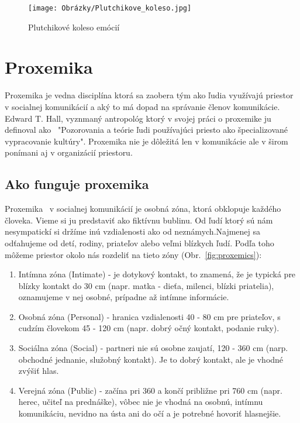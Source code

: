 \documentclass[10pt,twoside,slovak,a4paper]{article}
\begin{document}
\begin{figure}[H]
		\centering
		\texttt{[image: Obrázky/Plutchikove\_koleso.jpg]}
		\caption{Plutchikové koleso emócií~\cite{emocie}}
		\label{fig:EWheel}
\end{figure}

\pagebreak

\section{Proxemika}\label{proxemika}

Proxemika je vedna disciplína ktorá sa zaobera tým ako ľudia využívajú priestor v
socialnej komunikácií a aký to má dopad na správanie členov komunikácie. Edward T. Hall,
vyznmaný antropológ ktorý v svojej práci o proxemike ju definoval ako~\cite{proxemics} "Pozorovania a teórie
ľudi používajúci priesto ako špecializované vypracovanie kultúry". Proxemika nie je dôležitá
len v komunikácie ale v širom ponímani aj v organizácií priestoru.

\subsection{Ako funguje proxemika}\label{proxemika:funkcnost}

Proxemika~\cite{proxemika} v socialnej komunikácií je osobná zóna, ktorá obklopuje každého človeka. Vieme si ju
predstaviť ako fiktívnu bublinu. Od ľudí ktorý sú nám nesympatickí si držíme inú vzdialenosti ako
od neznámych.Najmenej sa odťahujeme od detí, rodiny, priateľov alebo veľmi blízkych ľudí. Podľa
toho môžeme priestor okolo nás rozdeliť na tieto zóny (Obr.~\ref{fig:proxemics}):

\begin{enumerate}
	\item Intímna zóna (Intimate) - je dotykový kontakt, to znamená, že je typická pre blízky kontakt do 30 cm (napr. matka - dieťa, milenci, blízki priatelia), oznamujeme v nej osobné, prípadne až intímne informácie.
	\item Osobná zóna (Personal) - hranica vzdialenosti 40 - 80 cm pre priateľov, s cudzím človekom 45 - 120 cm (napr. dobrý očný kontakt,  podanie ruky).
	\item Sociálna zóna (Social) - partneri nie sú osobne zaujatí, 120 - 360 cm (narp. obchodné jednanie, služobný kontakt). Je to dobrý kontakt, ale je vhodné zvýšiť hlas.
	\item Verejná zóna (Public) - začína pri 360 a končí približne pri 760 cm (napr. herec, učiteľ na prednáške), vôbec nie je vhodná na osobnú, intímnu komunikáciu, nevidno na ústa ani do očí a je potrebné hovoriť hlasnejšie.
\end{enumerate}
\end{document}
